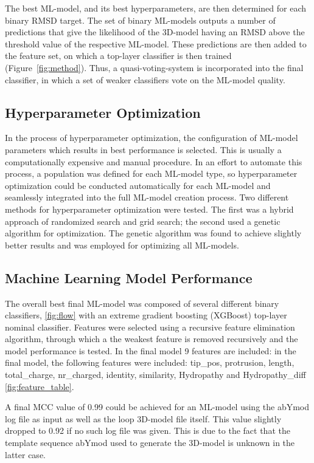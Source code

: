 \documentclass[12pt]{article}
\begin{document}
The best ML-model, and its best hyperparameters, are then determined for
each binary RMSD target. The set of binary ML-models outputs a number of
predictions that give the likelihood of the 3D-model having an RMSD above
the threshold value of the respective ML-model. These predictions are
then added to the feature set, on which a top-layer classifier is then
trained (Figure~\ref{fig:method}). Thus, a quasi-voting-system is incorporated into the final
classifier, in which a set of weaker classifiers vote on the ML-model
quality.

\subsection{Hyperparameter Optimization}
In the process of hyperparameter optimization, the configuration of
ML-model parameters which results in best performance is selected. This
is usually a computationally expensive and manual procedure.
In an effort to automate this process, a population was defined for
each ML-model type, so hyperparameter optimization could be conducted
automatically for each ML-model and seamlessly integrated into the full
ML-model creation process. Two different methods for hyperparameter
optimization were tested. The first was a hybrid approach of randomized
search and grid search; the second used a genetic algorithm for
optimization. The genetic algorithm was found to achieve slightly
better results and was employed for optimizing all ML-models.

\subsection{Machine Learning Model Performance}
The overall best final ML-model was composed of several different binary
classifiers, \ref{fig:flow} with an extreme gradient boosting (XGBoost) top-layer
nominal classifier. Features were selected using a recursive feature elimination algorithm, through which a the weakest feature is removed recursively and the model performance is tested. In the final model 9 features are included: in the final model, the following features were included: tip\_pos, protrusion, length, total\_charge, nr\_charged, identity, similarity, Hydropathy and Hydropathy\_diff \ref{fig:feature_table}.

A final MCC value of 0.99 could be achieved for an ML-model
using the abYmod log file as input as well as the loop 3D-model file
itself. This value slightly dropped to 0.92 if no such log file was
given. This is due to the fact that the template sequence
abYmod used to generate the 3D-model is unknown in the latter case.
\end{document}
